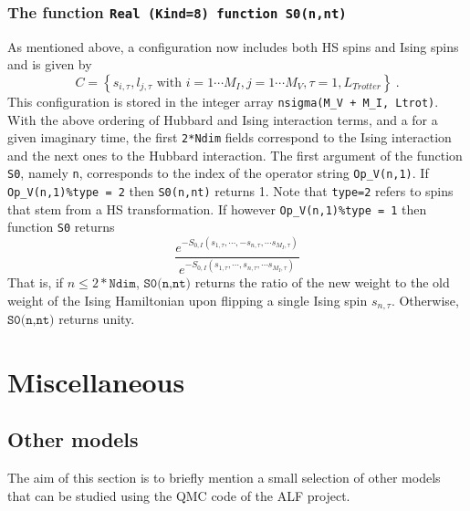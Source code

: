 \documentclass{SciPost}
\begin{document}
\subsubsection{The function \texttt{Real (Kind=8) function S0(n,nt)} }\label{sec:s0}
%
As mentioned above,  a configuration now includes both HS spins and Ising spins and is given by
\begin{equation}
	C = \left\{   s_{i,\tau} ,  l_{j,\tau}  \text{ with }  i=1\cdots M_I,  j = 1\cdots M_V,  \tau=1,L_{Trotter}  \right\}\:.
\end{equation}
This configuration is stored in the  integer array \texttt{nsigma(M\_V + M\_I, Ltrot)}.  With the above ordering of Hubbard and Ising interaction terms, and a for a given imaginary time, the first \texttt{2*Ndim} fields correspond to the Ising interaction and the next  ones to the Hubbard interaction.
The first   argument of the function \texttt{S0}, namely \texttt{n},  corresponds to the index of the operator  string 
\texttt{Op\_V(n,1)}. If \texttt{Op\_V(n,1)\%type = 2} then   \texttt{S0(n,nt)}  returns 1. Note that \texttt{type=2} refers to spins that stem from a  HS transformation. 
If however  \texttt{Op\_V(n,1)\%type = 1}  then function \texttt{S0}  returns
\begin{equation}
\frac{e^{-S_{0,I} \left(  s_{1,\tau},  \cdots,  - s_{n,\tau},  \cdots s_{M_I,\tau}   \right) } }{e^{-S_{0,I}  \left(  s_{1,\tau},  \cdots,   s_{n,\tau},  \cdots s_{M_I,\tau}   \right)   } }	
\end{equation}
That is,   if $n \leq 2* \texttt{Ndim} $,    $ \texttt{S0(n,nt)} $  returns the ratio of the new weight to the old weight  of the  Ising Hamiltonian upon flipping a single Ising spin $ s_{n,\tau} $.  Otherwise, $ \texttt{S0(n,nt)} $   returns unity. 

%
\section{Miscellaneous}\label{sec:misc}
%
\subsection{Other models}\label{sec:other_models}
%
The aim of this section is to briefly mention  a small  selection of  other models that can be studied using the QMC code of the ALF project.  
%  
\end{document}
